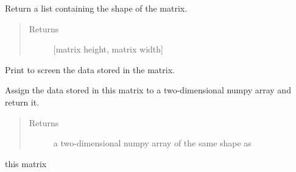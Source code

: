 \documentclass[letterpaper,10pt,english]{sphinxmanual}
\begin{document}
\begin{fulllineitems}
\begin{fulllineitems}
\end{fulllineitems}


\begin{fulllineitems}
\label{\detokenize{index:dbm_py.interface.Matrix.shape}}
Return a list containing the shape of the matrix.
\begin{quote}\begin{description}
\item[{Returns}] \leavevmode
{[}matrix height, matrix width{]}

\end{description}\end{quote}

\end{fulllineitems}


\begin{fulllineitems}
\label{\detokenize{index:dbm_py.interface.Matrix.show}}
Print to screen the data stored in the matrix.

\end{fulllineitems}


\begin{fulllineitems}
\label{\detokenize{index:dbm_py.interface.Matrix.to_np2darray}}
Assign the data stored in this matrix to a two-dimensional
numpy array and return it.
\begin{quote}\begin{description}
\item[{Returns}] \leavevmode
a two-dimensional numpy array of the same shape as

\end{description}\end{quote}

this matrix

\end{fulllineitems}


\end{fulllineitems}

\end{document}
